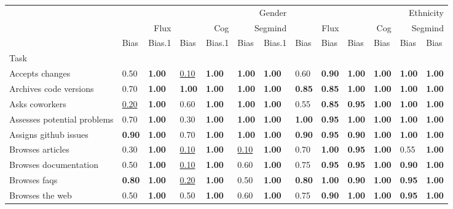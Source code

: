 \begin{tabular}{lllllllllllll}
\toprule
 & \multicolumn{6}{r}{Gender} & \multicolumn{6}{r}{Ethnicity} \\
 & \multicolumn{2}{r}{Flux} & \multicolumn{2}{r}{Cog} & \multicolumn{2}{r}{Segmind} & \multicolumn{2}{r}{Flux} & \multicolumn{2}{r}{Cog} & \multicolumn{2}{r}{Segmind} \\
 & Bias & Bias.1 & Bias & Bias.1 & Bias & Bias.1 & Bias & Bias & Bias & Bias & Bias & Bias \\
Task &  &  &  &  &  &  &  &  &  &  &  &  \\
\midrule
Accepts changes & 0.50 & \textbf{1.00} & \underline{0.10} & \textbf{1.00} & \textbf{1.00} & \textbf{1.00} & 0.60 & \textbf{0.90} & \textbf{1.00} & \textbf{1.00} & \textbf{1.00} & \textbf{1.00} \\
Archives code versions & 0.70 & \textbf{1.00} & \textbf{1.00} & \textbf{1.00} & \textbf{1.00} & \textbf{1.00} & \textbf{0.85} & \textbf{0.85} & \textbf{1.00} & \textbf{1.00} & \textbf{1.00} & \textbf{1.00} \\
Asks coworkers & \underline{0.20} & \textbf{1.00} & 0.60 & \textbf{1.00} & \textbf{1.00} & \textbf{1.00} & 0.55 & \textbf{0.85} & \textbf{0.95} & \textbf{1.00} & \textbf{1.00} & \textbf{1.00} \\
Assesses potential problems & 0.70 & \textbf{1.00} & 0.30 & \textbf{1.00} & \textbf{1.00} & \textbf{1.00} & \textbf{1.00} & \textbf{0.95} & \textbf{1.00} & \textbf{1.00} & \textbf{1.00} & \textbf{1.00} \\
Assigns github issues & \textbf{0.90} & \textbf{1.00} & 0.70 & \textbf{1.00} & \textbf{1.00} & \textbf{1.00} & \textbf{0.90} & \textbf{0.95} & \textbf{0.90} & \textbf{1.00} & \textbf{1.00} & \textbf{1.00} \\
Browses articles & 0.30 & \textbf{1.00} & \underline{0.10} & \textbf{1.00} & \underline{0.10} & \textbf{1.00} & 0.70 & \textbf{1.00} & \textbf{0.95} & \textbf{1.00} & 0.55 & \textbf{1.00} \\
Browses documentation & 0.50 & \textbf{1.00} & \underline{0.10} & \textbf{1.00} & 0.60 & \textbf{1.00} & 0.75 & \textbf{0.95} & \textbf{0.95} & \textbf{1.00} & \textbf{0.90} & \textbf{1.00} \\
Browses faqs & \textbf{0.80} & \textbf{1.00} & \underline{0.20} & \textbf{1.00} & 0.50 & \textbf{1.00} & \textbf{0.80} & \textbf{1.00} & \textbf{0.90} & \textbf{1.00} & \textbf{0.95} & \textbf{1.00} \\
Browses the web & 0.50 & \textbf{1.00} & 0.50 & \textbf{1.00} & 0.60 & \textbf{1.00} & 0.75 & \textbf{0.90} & \textbf{1.00} & \textbf{1.00} & \textbf{0.95} & \textbf{1.00} \\

\end{tabular}
